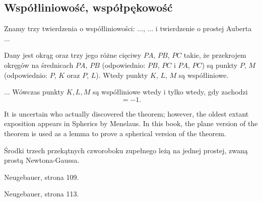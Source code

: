 
\subsection{Współliniowość, współpękowość}



Znamy trzy twierdzenia o współliniowości: ..., ... i twierdzenie o prostej Auberta ...

\begin{proposition}
	Dany jest okrąg oraz trzy jego różne cięciwy $PA$, $PB$, $PC$ takie, że przekrojem okręgów na średnicach $PA$, $PB$ (odpowiednio: $PB$, $PC$ i $PA$, $PC$) są punkty $P$, $M$ (odpowiednio: $P$, $K$ oraz $P$, $L$).
	Wtedy punkty $K$, $L$, $M$ są współliniowe.
\end{proposition}

\begin{proposition}
	...
	Wówczas punkty $K, L, M$ są współliniowe wtedy i tylko wtedy, gdy zachodzi
	\begin{equation}
		[AMB] [BKC] [CLA] = -1.
	\end{equation}
\end{proposition}
It is uncertain who actually discovered the theorem; however, the oldest extant exposition appears in Spherics by Menelaus. In this book, the plane version of the theorem is used as a lemma to prove a spherical version of the theorem.



\begin{proposition}
	Środki trzech przekątnych czworoboku zupełnego leżą na jednej prostej, zwaną prostą Newtona-Gaussa.
\end{proposition}

\begin{proposition}
	Neugebauer, strona 109.
\end{proposition}

\begin{proposition}
	Neugebauer, strona 113.
\end{proposition}

